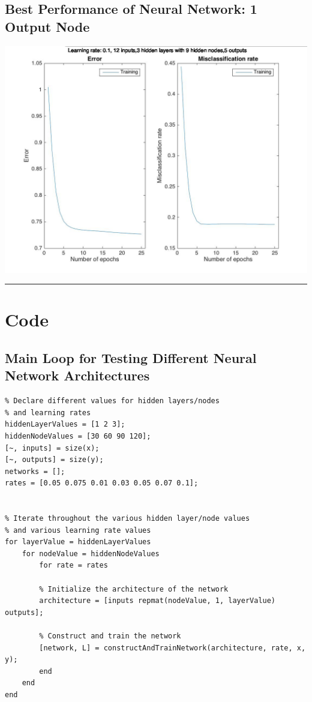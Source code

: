 \documentclass[12pt]{article}
\newcommand{\horizontalLine}{
	\begin{center}
		\hrule width 1.0\textwidth
	\end{center}
}
\begin{document}
\subsection{Best Performance of Neural Network: 1 Output Node}
\label{subsec:annBestPerformance}
\includegraphics[scale=0.45]{images/ann/bestRun}

\pagebreak
\horizontalLine
\section{Code}
\label{sec:code}

\subsection{Main Loop for Testing Different Neural Network Architectures}
\label{subsec:annLoop}
\begin{lstlisting}
% Declare different values for hidden layers/nodes
% and learning rates
hiddenLayerValues = [1 2 3];
hiddenNodeValues = [30 60 90 120];
[~, inputs] = size(x);
[~, outputs] = size(y);
networks = [];
rates = [0.05 0.075 0.01 0.03 0.05 0.07 0.1];


% Iterate throughout the various hidden layer/node values
% and various learning rate values
for layerValue = hiddenLayerValues
    for nodeValue = hiddenNodeValues
        for rate = rates
        
        % Initialize the architecture of the network
        architecture = [inputs repmat(nodeValue, 1, layerValue) outputs];
        
        % Construct and train the network
        [network, L] = constructAndTrainNetwork(architecture, rate, x, y);
        end
    end
end
\end{lstlisting}
\end{document}
